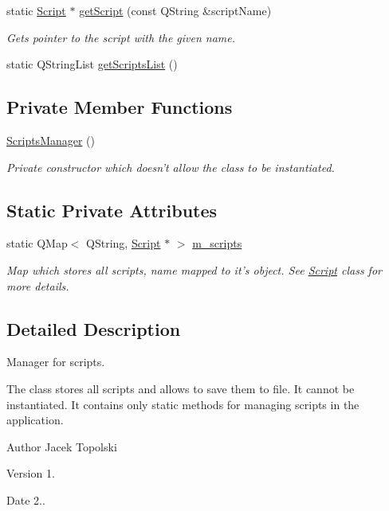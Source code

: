 \begin{DoxyCompactItemize}
static \hyperlink{class_script}{Script} $\ast$ \hyperlink{class_scripts_manager_a59b613ef7638d97bbdebe09a412e8f20}{get\-Script} (const Q\-String \&script\-Name)
\begin{DoxyCompactList}\small\item\em Gets pointer to the script with the given name. \end{DoxyCompactList}\item 
static Q\-String\-List \hyperlink{class_scripts_manager_a451c8dacfa4629cb69c3f7f1ca0326f0}{get\-Scripts\-List} ()
\end{DoxyCompactItemize}
\subsection*{Private Member Functions}
\begin{DoxyCompactItemize}
\item 
\hyperlink{class_scripts_manager_a6c0f74bb1ba41b0c29f388fc9b973489}{Scripts\-Manager} ()
\begin{DoxyCompactList}\small\item\em Private constructor which doesn't allow the class to be instantiated. \end{DoxyCompactList}\end{DoxyCompactItemize}
\subsection*{Static Private Attributes}
\begin{DoxyCompactItemize}
\item 
static Q\-Map$<$ Q\-String, \hyperlink{class_script}{Script} $\ast$ $>$ \hyperlink{class_scripts_manager_adcf2fffc60140c92bbca764602f322aa}{m\-\_\-scripts}
\begin{DoxyCompactList}\small\item\em Map which stores all scripts, name mapped to it's object. See \hyperlink{class_script}{Script} class for more details. \end{DoxyCompactList}\end{DoxyCompactItemize}


\subsection{Detailed Description}
Manager for scripts. 

The class stores all scripts and allows to save them to file. It cannot be instantiated. It contains only static methods for managing scripts in the application. \begin{DoxyAuthor}{Author}
Jacek Topolski 
\end{DoxyAuthor}
\begin{DoxyVersion}{Version}
1. 
\end{DoxyVersion}
\begin{DoxyDate}{Date}
2.. 
\end{DoxyDate}


